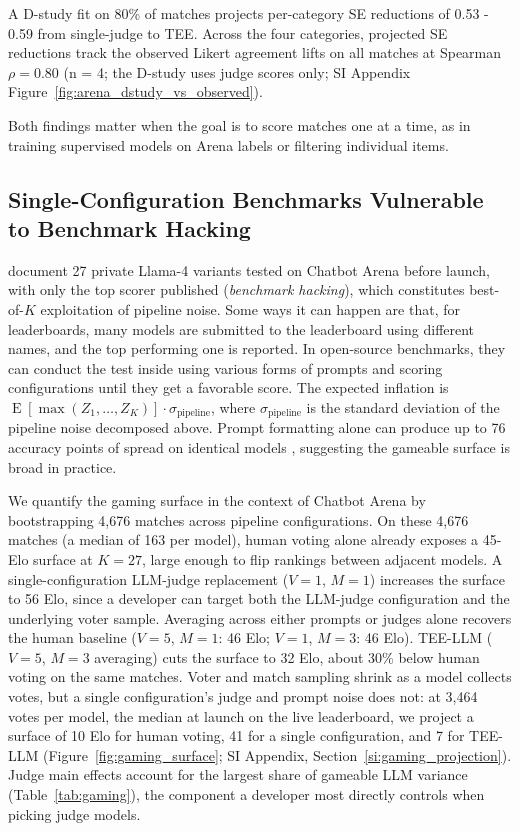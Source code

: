 \documentclass{article}
\DeclareMathOperator{\E}{E}
\begin{document}
A D-study fit on 80\% of matches projects per-category SE reductions of 0.53 - 0.59 from single-judge to TEE. Across the four categories, projected SE reductions track the observed Likert agreement lifts on all matches at Spearman $\rho = 0.80$ (n = 4; the D-study uses judge scores only; SI Appendix Figure~\ref{fig:arena_dstudy_vs_observed}).

Both findings matter when the goal is to score matches one at a time, as in training supervised models on Arena labels \citep{egami2024dsl} or filtering individual items.



\subsection{Single-Configuration Benchmarks Vulnerable to Benchmark Hacking}
\label{sec:gaming}

\citet{singh2025leaderboard} document 27 private Llama-4 variants tested on Chatbot Arena before launch, with only the top scorer published (\emph{benchmark hacking}), which constitutes best-of-$K$ exploitation of pipeline noise. Some ways it can happen are that, for leaderboards, many models are submitted to the leaderboard using different names, and the top performing one is reported. In open-source benchmarks, they can conduct the test inside using various forms of prompts and scoring configurations until they get a favorable score. The expected inflation is $\E[\max(Z_1,\ldots,Z_K)] \cdot \sigma_{\text{pipeline}}$, where $\sigma_{\text{pipeline}}$ is the standard deviation of the pipeline noise decomposed above. Prompt formatting alone can produce up to 76 accuracy points of spread on identical models \citep{sclar2024sensitivity}, suggesting the gameable surface is broad in practice.

We quantify the gaming surface in the context of Chatbot Arena by bootstrapping 4,676 matches across pipeline configurations. On these 4,676 matches (a median of 163 per model), human voting alone already exposes a 45-Elo surface at $K{=}27$, large enough to flip rankings between adjacent models. A single-configuration LLM-judge replacement ($V{=}1$, $M{=}1$) increases the surface to 56 Elo, since a developer can target both the LLM-judge configuration and the underlying voter sample. Averaging across either prompts or judges alone recovers the human baseline ($V{=}5$, $M{=}1$: 46 Elo; $V{=}1$, $M{=}3$: 46 Elo). TEE-LLM ($V{=}5$, $M{=}3$ averaging) cuts the surface to 32 Elo, about 30\% below human voting on the same matches. Voter and match sampling shrink as a model collects votes, but a single configuration's judge and prompt noise does not: at 3,464 votes per model, the median at launch on the live leaderboard, we project a surface of 10 Elo for human voting, 41 for a single configuration, and 7 for TEE-LLM (Figure~\ref{fig:gaming_surface}; SI Appendix, Section~\ref{si:gaming_projection}). Judge main effects account for the largest share of gameable LLM variance (Table~\ref{tab:gaming}), the component a developer most directly controls when picking judge models.
\end{document}
